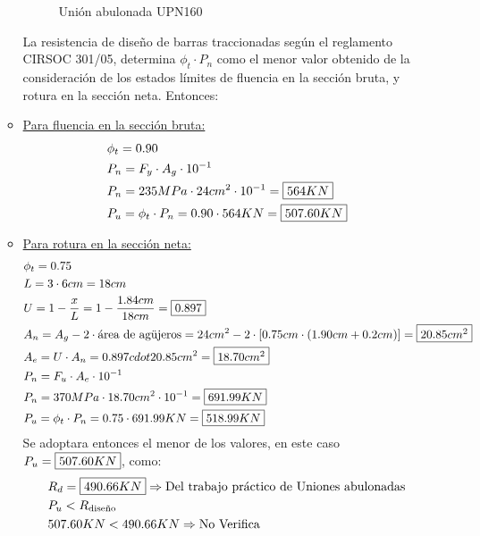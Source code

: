 \begin{enumerate}
\begin{itemize}
\begin{figure}[H]
\begin{center}
\end{center}
\caption{Unión abulonada UPN160}
\end{figure}
La resistencia de diseño de barras traccionadas según el reglamento CIRSOC 301/05, determina $\phi_t \cdot P_n$ como el menor valor obtenido de la consideración de los estados límites de fluencia en la sección bruta, y rotura en la sección neta. Entonces:\\
\item \underline{Para fluencia en la sección bruta:}
\begin{align*}
& \phi_t = 0.90 \\
& P_n = F_y \cdot A_g \cdot 10^{-1} \\
& P_n = 235MPa \cdot 24cm^2 \cdot 10^{-1} = \framebox{$564KN$}\\
& P_u = \phi_t \cdot P_n = 0.90 \cdot 564KN = \framebox{$507.60KN$}
\end{align*}

\item \underline{Para rotura en la sección neta:}
\begin{align*}
& \phi_t = 0.75 \\
& L = 3 \cdot 6cm = 18cm \\
& U = 1 - \frac{x}{L} = 1 - \frac{1.84cm}{18cm} = \framebox{$0.897$}\\
& A_n = A_g - 2 \cdot \text{área de agüjeros} = 24cm^2 - 2 \cdot [0.75cm \cdot (1.90cm + 0.2cm)] = \framebox{$20.85cm^2$}\\
& A_e = U \cdot A_n = 0.897 cdot 20.85cm^2 = \framebox{$18.70cm^2$}\\
& P_n = F_u \cdot A_e \cdot 10^{-1} \\
& P_n = 370MPa \cdot 18.70cm^2 \cdot 10^{-1} = \framebox{$691.99KN$}\\
& P_u = \phi_t \cdot P_n = 0.75 \cdot 691.99KN = \framebox{$518.99KN$}
\end{align*}
Se adoptara entonces el menor de los valores, en este caso $P_u = \framebox{$507.60KN$}$, como:
\begin{align*}
& R_d = \framebox{$490.66KN$} \Rightarrow \text{Del trabajo práctico de Uniones abulonadas}\\
& P_u < R_{\text{diseño}} \\
& 507.60KN < 490.66KN \Rightarrow \text{No Verifica}
\end{align*}


\end{itemize}
\end{enumerate}
